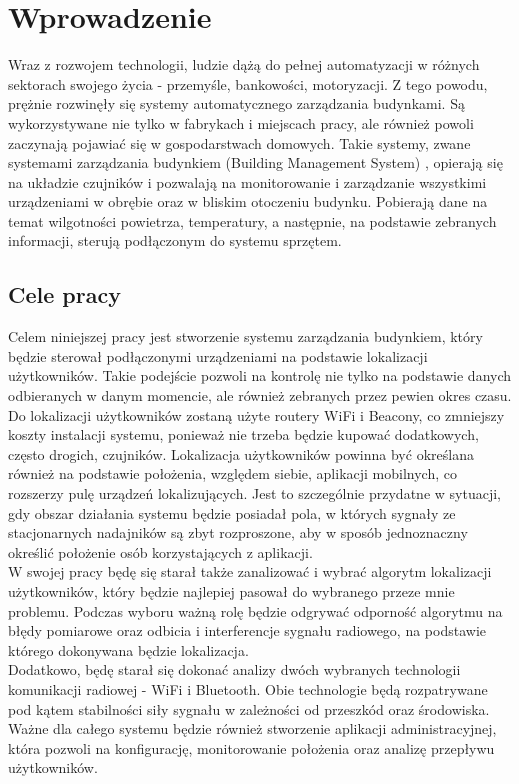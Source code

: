 \chapter{Wprowadzenie}
\label{cha:wprowadzenie}

Wraz z rozwojem technologii, ludzie dążą do pełnej automatyzacji w różnych sektorach swojego życia - przemyśle, bankowości, motoryzacji. Z tego powodu, prężnie rozwinęły się systemy automatycznego zarządzania budynkami. Są wykorzystywane nie tylko w fabrykach i miejscach pracy, ale również powoli zaczynają pojawiać się w gospodarstwach domowych. Takie systemy, zwane systemami zarządzania budynkiem (Building Management System) \cite{BMS}, opierają się na układzie czujników i pozwalają na monitorowanie i zarządzanie wszystkimi urządzeniami w obrębie oraz w bliskim otoczeniu budynku. Pobierają dane na temat wilgotności powietrza, temperatury, a następnie, na podstawie zebranych informacji, sterują podłączonym do systemu sprzętem.


\section{Cele pracy}
\label{sec:celePracy}

Celem niniejszej pracy jest stworzenie systemu zarządzania budynkiem, który będzie sterował podłączonymi urządzeniami na podstawie lokalizacji użytkowników. Takie podejście pozwoli na kontrolę nie tylko na podstawie danych odbieranych w danym momencie, ale również zebranych przez pewien okres czasu. Do lokalizacji użytkowników zostaną użyte routery WiFi i Beacony, co zmniejszy koszty instalacji systemu, ponieważ nie trzeba będzie kupować dodatkowych, często drogich, czujników. Lokalizacja użytkowników powinna być określana również na podstawie położenia, względem siebie, aplikacji mobilnych, co rozszerzy pulę urządzeń lokalizujących. Jest to szczególnie przydatne w sytuacji, gdy obszar działania systemu będzie posiadał pola, w których sygnały ze stacjonarnych nadajników są zbyt rozproszone, aby w sposób jednoznaczny określić położenie osób korzystających z aplikacji.\\
W swojej pracy będę się starał także zanalizować i wybrać algorytm lokalizacji użytkowników, który będzie najlepiej pasował do wybranego przeze mnie problemu. Podczas wyboru ważną rolę będzie odgrywać odporność algorytmu na błędy pomiarowe oraz odbicia i interferencje sygnału radiowego, na podstawie którego dokonywana będzie lokalizacja.\\
Dodatkowo, będę starał się dokonać analizy dwóch wybranych technologii komunikacji radiowej - WiFi i Bluetooth. Obie technologie będą rozpatrywane pod kątem stabilności siły sygnału w zależności od przeszkód oraz środowiska.\\
Ważne dla całego systemu będzie również stworzenie aplikacji administracyjnej, która pozwoli na konfigurację, monitorowanie położenia oraz analizę przepływu użytkowników.\\